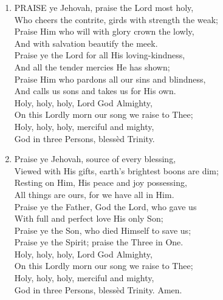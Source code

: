 \begin{enumerate}
    \item PRAISE ye Jehovah, praise the Lord most holy, \\
        Who cheers the contrite, girds with strength the weak; \\
        Praise Him who will with glory crown the lowly, \\
        And with salvation beautify the meek. \\
        Praise ye the Lord for all His loving-kindness, \\
        And all the tender mercies He has shown; \\
        Praise Him who pardons all our sins and blindness, \\
        And calls us sons and takes us for His own. \\
        Holy, holy, holy, Lord God Almighty, \\
        On this Lordly morn our song we raise to Thee; \\
        Holy, holy, holy, merciful and mighty, \\
        God in three Persons, bless\`ed Trinity.

    \item Praise ye Jehovah, source of every blessing, \\
        Viewed with His gifts, earth's brightest boons are dim; \\
        Resting on Him, His peace and joy possessing, \\
        All things are ours, for we have all in Him. \\
        Praise ye the Father, God the Lord, who gave us \\
        With full and perfect love His only Son; \\
        Praise ye the Son, who died Himself to save us; \\
        Praise ye the Spirit; praise the Three in One. \\
        Holy, holy, holy, Lord God Almighty, \\
        On this Lordly morn our song we raise to Thee; \\
        Holy, holy, holy, merciful and mighty, \\
        God in three Persons, bless\`ed Trinity. Amen.

\end{enumerate}
